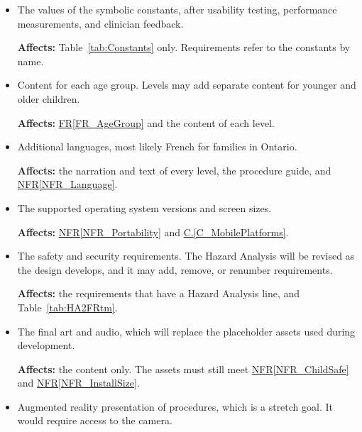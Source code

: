 \documentclass[12pt]{article}
\newcommand{\conref}[1]{\hyperref[#1]{C.\ref*{#1}}}
\newcommand{\rref}[1]{\hyperref[#1]{FR\ref*{#1}}}
\newcommand{\nfrref}[1]{\hyperref[#1]{NFR\ref*{#1}}}
\newcounter{lcnum} %
\begin{document}
\begin{itemize}
\textbf{Affects:} the game content (Table~\ref{tab:ModelContent}),
\rref{FR_ChooseCharacter}, \rref{FR_DiverseCharacters}, and \rref{FR_Shop}.

\item[\refstepcounter{lcnum}\textbf{LC\thelcnum}\label{LC_Constants}:]
The values of the symbolic constants, after usability testing, performance
measurements, and clinician feedback.

\textbf{Affects:} Table~\ref{tab:Constants} only. Requirements refer to the
constants by name.

\item[\refstepcounter{lcnum}\textbf{LC\thelcnum}\label{LC_AgeContent}:]
Content for each age group. Levels may add separate content for younger and
older children.

\textbf{Affects:} \rref{FR_AgeGroup} and the content of each level.

\item[\refstepcounter{lcnum}\textbf{LC\thelcnum}\label{LC_Language}:]
Additional languages, most likely French for families in Ontario.

\textbf{Affects:} the narration and text of every level, the procedure guide,
and \nfrref{NFR_Language}.

\item[\refstepcounter{lcnum}\textbf{LC\thelcnum}\label{LC_Platforms}:]
The supported operating system versions and screen sizes.

\textbf{Affects:} \nfrref{NFR_Portability} and \conref{C_MobilePlatforms}.

\item[\refstepcounter{lcnum}\textbf{LC\thelcnum}\label{LC_Hazards}:]
The safety and security requirements. The Hazard Analysis will be revised as
the design develops, and it may add, remove, or renumber requirements.

\textbf{Affects:} the requirements that have a Hazard Analysis line, and
Table~\ref{tab:HA2FRtm}.

\item[\refstepcounter{lcnum}\textbf{LC\thelcnum}\label{LC_Assets}:]
The final art and audio, which will replace the placeholder assets used during
development.

\textbf{Affects:} the content only. The assets must still meet
\nfrref{NFR_ChildSafe} and \nfrref{NFR_InstallSize}.

\item[\refstepcounter{lcnum}\textbf{LC\thelcnum}\label{LC_AR}:]
Augmented reality presentation of procedures, which is a stretch goal. It
would require access to the camera.


\end{itemize}
\end{document}
